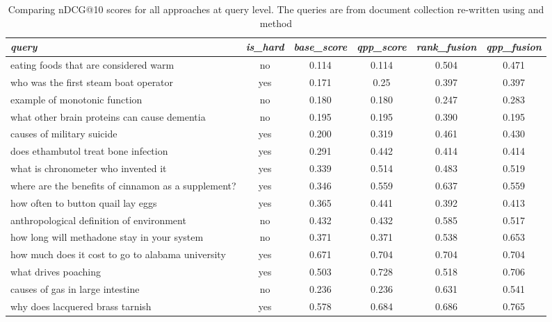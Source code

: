 \begin{table*}[hbt!]
    \centering
    \begin{tabular}{lccccc}
        \toprule
            \textit{query} & \textit{is\_hard} & \textit{base\_score} & \textit{qpp\_score} & \textit{rank\_fusion} & \textit{qpp\_fusion}\\
            \midrule

eating foods that are considered warm & no & 0.114 & 0.114 & 0.504 & 0.471\\
who was the first steam boat operator & yes & 0.171 & 0.25 & 0.397 & 0.397\\
example of monotonic function & no & 0.180 & 0.180 & 0.247 & 0.283\\
what other brain proteins can cause dementia & no & 0.195 & 0.195 & 0.390 & 0.195\\
causes of military suicide & yes & 0.200 & 0.319 & 0.461 & 0.430\\
does ethambutol treat bone infection & yes & 0.291 & 0.442 & 0.414 & 0.414\\
what is chronometer who invented it & yes & 0.339 & 0.514 & 0.483 & 0.519\\
where are the benefits of cinnamon as a supplement? & yes & 0.346 & 0.559 & 0.637 & 0.559\\
how often to button quail lay eggs & yes & 0.365 & 0.441 & 0.392 & 0.413\\
anthropological definition of environment & no & 0.432 & 0.432 & 0.585 & 0.517\\
how long will methadone stay in your system & no & 0.371 & 0.371 & 0.538 & 0.653\\
how much does it cost to go to alabama university & yes & 0.671 & 0.704 & 0.704 & 0.704\\
what drives poaching & yes & 0.503 & 0.728 & 0.518 & 0.706\\
causes of gas in large intestine & no & 0.236 & 0.236 & 0.631 & 0.541\\
why does lacquered brass tarnish & yes & 0.578 & 0.684 & 0.686 & 0.765\\


        \bottomrule        
    \end{tabular}
    \caption{Comparing nDCG@10 scores for all approaches at query level. The queries are from \mshard{} document collection re-written using \chatgpt{} and \car{} method}
    \vspace{-5mm}
    \label{tab:compare_all_approaches}
\end{table*}
